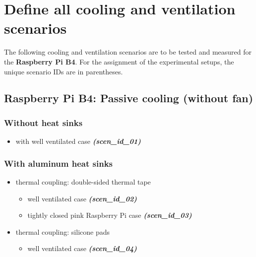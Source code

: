 \documentclass[10pt,parskip=half,
toc=sectionentrywithdots,
bibliography=totocnumbered,
captions=tableheading,numbers=noendperiod]{scrartcl}
\providecommand{\tightlist}{%
  \setlength{\itemsep}{0pt}\setlength{\parskip}{0pt}}
\begin{document}
\hypertarget{define-all-cooling-and-ventilation-scenarios}{%
\section{Define all cooling and ventilation
scenarios}\label{define-all-cooling-and-ventilation-scenarios}}

The following cooling and ventilation scenarios are to be tested and
measured for the \textbf{Raspberry Pi B4}. For the assignment of the
experimental setups, the unique scenario IDs are in parentheses.

\hypertarget{raspberry-pi-b4-passive-cooling-without-fan}{%
\subsection{Raspberry Pi B4: Passive cooling (without
fan)}\label{raspberry-pi-b4-passive-cooling-without-fan}}

\hypertarget{without-heat-sinks}{%
\subsubsection{Without heat sinks}\label{without-heat-sinks}}

\begin{itemize}
\tightlist
\item
  with well ventilated case \textbf{\emph{(scen\_id\_01)}}
\end{itemize}

\hypertarget{with-aluminum-heat-sinks}{%
\subsubsection{With aluminum heat
sinks}\label{with-aluminum-heat-sinks}}

\begin{itemize}
\tightlist
\item
  thermal coupling: double-sided thermal tape

  \begin{itemize}
  \tightlist
  \item
    well ventilated case \textbf{\emph{(scen\_id\_02)}}
  \item
    tightly closed pink Raspberry Pi case \textbf{\emph{(scen\_id\_03)}}
  \end{itemize}
\item
  thermal coupling: silicone pads

  \begin{itemize}
  \tightlist
  \item
    well ventilated case \textbf{\emph{(scen\_id\_04)}}
  \end{itemize}
\end{itemize}
\end{document}
